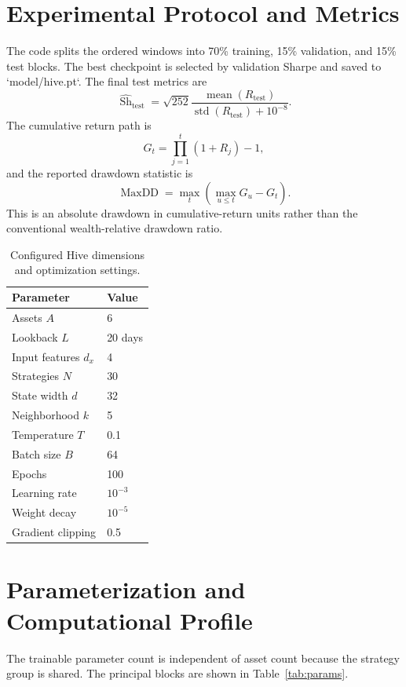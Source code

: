 \documentclass[10pt,a4paper,twocolumn]{article}
\begin{document}
\section{Experimental Protocol and Metrics}
The code splits the ordered windows into 70\% training, 15\% validation, and 15\% test blocks. The best checkpoint is selected by validation Sharpe and saved to `model/hive.pt`. The final test metrics are
\begin{equation}
\widehat{\operatorname{Sh}}_{\mathrm{test}}=\sqrt{252}\frac{\operatorname{mean}(R_{\mathrm{test}})}{\operatorname{std}(R_{\mathrm{test}})+10^{-8}}.
\end{equation}
The cumulative return path is
\begin{equation}
G_t=\prod_{j=1}^{t}(1+R_j)-1,
\end{equation}
and the reported drawdown statistic is
\begin{equation}
\operatorname{MaxDD}=\max_t\left(\max_{u\leq t}G_u-G_t\right).
\end{equation}
This is an absolute drawdown in cumulative-return units rather than the conventional wealth-relative drawdown ratio.

\begin{table}[t]
\centering
\caption{Configured Hive dimensions and optimization settings.}
\small
\begin{tabular}{@{}ll@{}}
\toprule
Parameter & Value \\
\midrule
Assets $A$ & 6 \\
Lookback $L$ & 20 days \\
Input features $d_x$ & 4 \\
Strategies $N$ & 30 \\
State width $d$ & 32 \\
Neighborhood $k$ & 5 \\
Temperature $T$ & 0.1 \\
Batch size $B$ & 64 \\
Epochs & 100 \\
Learning rate & $10^{-3}$ \\
Weight decay & $10^{-5}$ \\
Gradient clipping & 0.5 \\
\bottomrule
\end{tabular}
\end{table}

\section{Parameterization and Computational Profile}
The trainable parameter count is independent of asset count because the strategy group is shared. The principal blocks are shown in Table~\ref{tab:params}.
\end{document}
